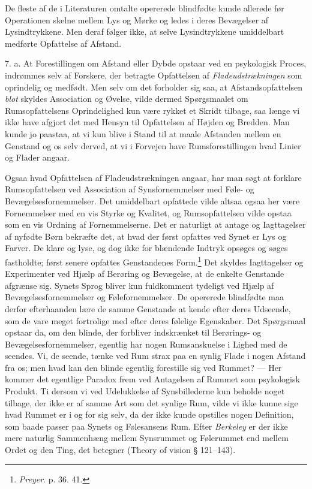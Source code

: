 \documentclass[12pt,a4paper,openany]{book}
\newcommand{\opage}[1]{\marginnote{\footnotesize\textit{[#1]}}}
\begin{document}
De fleste af de i Literaturen omtalte opererede blindfødte kunde
allerede før Operationen skelne mellem Lys og Mørke og ledes i deres
Bevægelser af Lysindtrykkene. Men deraf følger ikke, at selve
Lysindtrykkene umiddelbart medførte Opfattelse af Afstand.

7. a. At Forestillingen om Afstand eller Dybde opstaar ved en
psykologisk Proces, indrømmes selv af Forskere, der betragte Opfattelsen
af \emph{Fladeudstrækningen} som oprindelig og medfødt. Men selv om det
forholder sig saa, at Afstandsopfattelsen \emph{blot} skyldes
Association og Øvelse, vilde dermed Spørgsmaalet om Rumsopfattelsens
Oprindelighed kun være rykket et Skridt tilbage, saa længe vi ikke have
afgjort det med Hensyn til Opfattelsen af Højden og Bredden. Man kunde
jo paastaa, at vi kun blive i Stand til at maale Afstanden mellem en
Genstand og os selv derved, at vi i Forvejen have Rumsforestillingen
hvad Linier og Flader angaar.

Ogsaa hvad Opfattelsen af Fladeudstrækningen angaar, har man søgt at
forklare Rumsopfattelsen ved Association af Synsfornemmelser med Føle-
og Bevægelsesfornemmelser. Det umiddelbart opfattede vilde altsaa ogsaa
her være Fornemmelser med en vis Styrke og Kvalitet, og Rumsopfattelsen
vilde opstaa som en vis Ordning af Fornemmelserne. Det er naturligt at
antage og Iagttagelser af nyfødte Børn bekræfte det, at hvad der først
opfattes ved Synet er Lys og Farver. De klare og
\opage{241}lyse, og dog ikke for blændende Indtryk opsøges og søges
fastholdte; først senere opfattes Genstandenes
Form.\footnote[1]{\emph{Preyer}. p. 36. 41.} Det skyldes Iagttagelser og
Experimenter ved Hjælp af Berøring og Bevægelse, at de enkelte Genstande
afgrænse sig. Synets Sprog bliver kun fuldkomment tydeligt ved Hjælp af
Bevægelsesfornemmelser og Følefornemmelser. De opererede blindfødte maa
derfor efterhaanden lære de samme Genstande at kende efter deres
Udseende, som de vare meget fortrolige med efter deres følelige
Egenskaber. Det Spørgsmaal opstaar da, om den blinde, der forbliver
indskrænket til Berørings- og Bevægelsesfornemmelser, egentlig har nogen
Rumsanskuelse i Lighed med de seendes. Vi, de seende, tænke ved Rum
strax paa en synlig Flade i nogen Afstand fra os; men hvad kan den
blinde egentlig forestille sig ved Rummet? --- Her kommer det egentlige
Paradox frem ved Antagelsen af Rummet som psykologisk Produkt. Ti dersom
vi ved Udelukkelse af Synsbillederne kun beholde noget tilbage, der ikke
er af samme Art som det synlige Rum, vilde vi ikke kunne sige hvad
Rummet er i og for sig selv, da der ikke kunde opstilles nogen
Definition, som baade passer paa Synets og Følesansens Rum. Efter
\emph{Berkeley} er der ikke mere naturlig Sammenhæng mellem Synsrummet
og Følerummet end mellem Ordet og den Ting, det betegner (Theory of
vision § 121--143).
\end{document}
